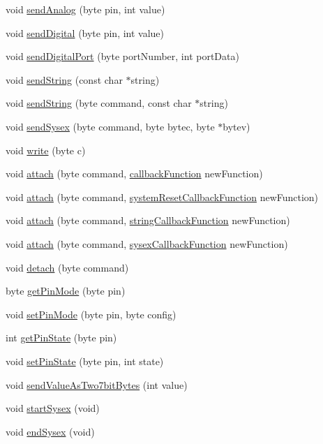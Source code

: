 \begin{DoxyCompactItemize}
void \hyperlink{class_firmata_class_ae14e1d8d9bd72068f6e8ca07721e8dda}{send\+Analog} (byte pin, int value)
\item 
void \hyperlink{class_firmata_class_a50a87e8339cf46fb787759603603e225}{send\+Digital} (byte pin, int value)
\item 
void \hyperlink{class_firmata_class_a799b91e5a888dd21b066a2020d8e2b68}{send\+Digital\+Port} (byte port\+Number, int port\+Data)
\item 
void \hyperlink{class_firmata_class_abe11f621154afd308926129de349fc6e}{send\+String} (const char $\ast$string)
\item 
void \hyperlink{class_firmata_class_ab139c0d784e69003c88eb5be8807dcdf}{send\+String} (byte command, const char $\ast$string)
\item 
void \hyperlink{class_firmata_class_a81e2de5b37eb2372c8a3d9a43d5eb0cc}{send\+Sysex} (byte command, byte bytec, byte $\ast$bytev)
\item 
void \hyperlink{class_firmata_class_ae8f29a829e17379602fcb9fd6a497807}{write} (byte c)
\item 
void \hyperlink{class_firmata_class_a94d53e24e973eb18fd4202b9d26a87c1}{attach} (byte command, \hyperlink{_firmata_8h_abb0d9dbaf4bb25bc00924808c5616aa5}{callback\+Function} new\+Function)
\item 
void \hyperlink{class_firmata_class_a5e6b3ec98bd2e616678ac0d6f3be60ba}{attach} (byte command, \hyperlink{_firmata_8h_a29f7a316045cd131238d6e3f9cdb8140}{system\+Reset\+Callback\+Function} new\+Function)
\item 
void \hyperlink{class_firmata_class_a3c3c11878d74fabadd50c66badf953ae}{attach} (byte command, \hyperlink{_firmata_8h_a6557a1064a699527f15a5d4d44c9c76d}{string\+Callback\+Function} new\+Function)
\item 
void \hyperlink{class_firmata_class_a81c394577d72b48bf74bdf47427562ab}{attach} (byte command, \hyperlink{_firmata_8h_a382e396031e042c702aebc1eac88c8da}{sysex\+Callback\+Function} new\+Function)
\item 
void \hyperlink{class_firmata_class_a8f6441132a0ffa4e548e9e9bce89044a}{detach} (byte command)
\item 
byte \hyperlink{class_firmata_class_a0c434227456ce2ba97b3b1142c329f96}{get\+Pin\+Mode} (byte pin)
\item 
void \hyperlink{class_firmata_class_a32c41dd94c1d23aa0e6d3d1dbe5c0c04}{set\+Pin\+Mode} (byte pin, byte config)
\item 
int \hyperlink{class_firmata_class_acf5d4f460b9a2298653d4a71de918dfe}{get\+Pin\+State} (byte pin)
\item 
void \hyperlink{class_firmata_class_aa9f98ba5069823b4c1d08db9f8999ba8}{set\+Pin\+State} (byte pin, int state)
\item 
void \hyperlink{class_firmata_class_a770e43f26f18204e43acebf9202a6d39}{send\+Value\+As\+Two7bit\+Bytes} (int value)
\item 
void \hyperlink{class_firmata_class_a3cc7ea1af348bca3ea0bd570314cada3}{start\+Sysex} (void)
\item 
void \hyperlink{class_firmata_class_a9bb68afbb1d37a7990f59a1d419e64c9}{end\+Sysex} (void)
\end{DoxyCompactItemize}


